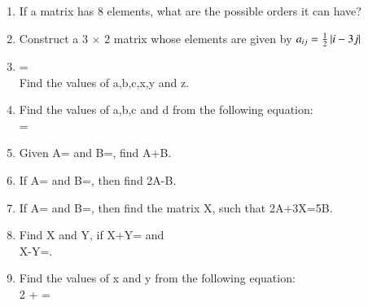 \begin{enumerate}[label=\arabic*.,ref=\thesubsection.\theenumi]
 \item  If a matrix has 8 elements, what are the possible orders it can have?\\
    \item Construct a 3 $\times$ 2 matrix whose elements are given by $a_{ij}=\frac{1}{2}\left\vert i-3j\right\vert$\\
    \item {}=\\
    Find the values of a,b,c,x,y and z.\\
\solution 

    \item Find the values of a,b,c and d from the following equation:\\
    =\\
    \item Given A= and B=, find A+B.\\\solution 


    \item If A= and B=, then find 2A-B.\\
    \item If A= and B=, then find the matrix X, such that 2A+3X=5B.\\
    \item Find X and Y, if X+Y= and \\X-Y=.\\
    \item Find the values of x and y from the following equation:\\
    2 +  = \\
     

\end{enumerate}
